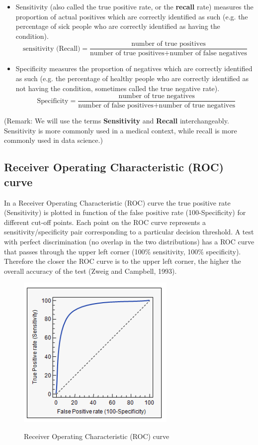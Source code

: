 \documentclass[]{report}
\begin{document}
\begin{itemize}
\item Sensitivity (also called the true positive rate, or the \textbf{recall} rate) measures the proportion of actual positives which are correctly identified as such (e.g. the percentage of sick people who are correctly identified as having the condition).
    \[ \mbox{sensitivity (Recall)} = \frac{ \mbox{number of true positives} } {\mbox{number of true positives} + \mbox{number of false negatives}} \]

\item Specificity measures the proportion of negatives which are correctly identified as such (e.g. the percentage of healthy people who are correctly identified as not having the condition, sometimes called the true negative rate).
    \[ \mbox{ Specificity} = \frac{ \mbox{number of true negatives} } {\mbox{number of false positives} + \mbox{number of true negatives}} \]

\end{itemize}

(Remark: We will use the terms \textbf{Sensitivity} and \textbf{Recall} interchangeably. Sensitivity is more commonly used in a medical context, while recall is more commonly used in data science.)

\subsection{Receiver Operating Characteristic (ROC) curve }


In a Receiver Operating Characteristic (ROC) curve the true positive rate (Sensitivity) is plotted in function of the false positive rate (100-Specificity) for different cut-off points. Each point on the ROC curve represents a sensitivity/specificity pair corresponding to a particular decision threshold. A test with perfect discrimination (no overlap in the two distributions) has a ROC curve that passes through the upper left corner (100\% sensitivity, 100\% specificity). Therefore the closer the ROC curve is to the upper left corner, the higher the overall accuracy of the test (Zweig and Campbell, 1993).

\begin{figure}
  \includegraphics[scale=0.7]{images/ROCcurve.PNG}\\
  \caption{Receiver Operating Characteristic (ROC) curve }\label{ROC1}
\end{figure}
\end{document}
